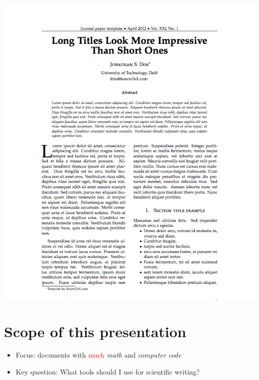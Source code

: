 \documentclass[%
twoside,                 %
final,                   %
chapterprefix=true,      %
open=right               %
10pt]{book}
\begin{document}

\begin{center}  %
  \centerline{\includegraphics[width=1.2\linewidth]{fig/latex_paper1.png}}
\end{center}



\section*{Scope of this presentation}

\begin{itemize}
  \item Focus: documents with \textcolor{red}{much} \emph{math} and \emph{computer code}

  \item Key question: What tools should I use for scientific writing?
\end{itemize}
\end{document}
